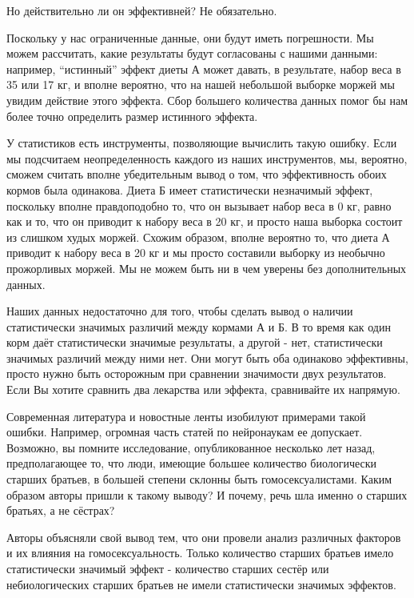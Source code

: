 Но действительно ли он эффективней? Не обязательно.

Поскольку у нас ограниченные данные, они будут иметь погрешности. Мы можем рассчитать, какие результаты будут согласованы с нашими данными: например, ``истинный'' эффект диеты А может давать, в результате, набор веса в 35 или 17 кг, и вполне вероятно, что на нашей небольшой выборке моржей мы увидим действие этого эффекта. Сбор большего количества данных помог бы нам более точно определить размер истинного эффекта.

У статистиков есть инструменты, позволяющие вычислить такую ошибку. Если мы подсчитаем неопределенность каждого из наших инструментов, мы, вероятно, сможем считать вполне убедительным вывод о том, что эффективность обоих кормов была одинакова. Диета Б имеет статистически незначимый эффект, поскольку вполне правдоподобно то, что он вызывает набор веса в 0 кг, равно как и то, что он приводит к набору веса в 20 кг, и просто наша выборка состоит из слишком худых моржей. Схожим образом, вполне вероятно то, что диета А приводит к набору веса в 20 кг и мы просто составили выборку из необычно прожорливых моржей. Мы не можем быть ни в чем уверены без дополнительных данных.


Наших данных недостаточно для того, чтобы сделать вывод о наличии статистически значимых различий между кормами А и Б. В то время как один корм даёт статистически значимые результаты, а другой - нет, статистически значимых различий между ними нет. Они могут быть оба одинаково эффективны, просто нужно быть осторожным при сравнении значимости двух результатов. Если Вы хотите сравнить два лекарства или эффекта, сравнивайте их напрямую. 

Современная литература и новостные ленты изобилуют примерами такой ошибки. Например, огромная часть статей по нейронаукам ее допускает.\cite{nieuwenhuis_erroneous_2011} Возможно, вы помните исследование, опубликованное несколько лет назад, предполагающее то, что люди, имеющие большее количество биологически старших братьев, в большей степени склонны быть гомосексуалистами.\cite{bogaert_biological_2006} Каким образом авторы пришли к такому выводу? И почему, речь шла именно о старших братьях, а не сёстрах?   

Авторы объясняли свой вывод тем, что они провели анализ различных факторов и их влияния на гомосексуальность. Только количество старших братьев имело статистически значимый эффект - количество старших сестёр или небиологических старших братьев не имели статистически значимых эффектов. 


